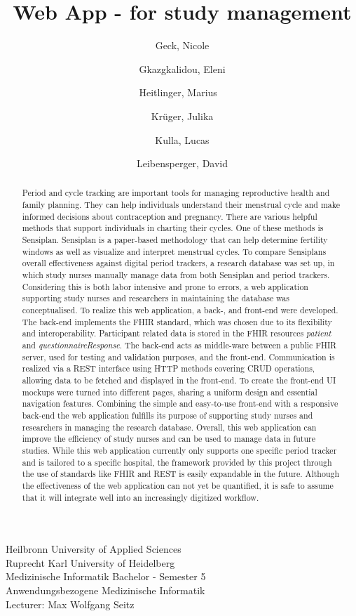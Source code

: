\documentclass[
a4paper,
11pt
]{article}
\title{Web App - for study management}
\author{
	Geck, Nicole
	\and
	Gkazgkalidou, Eleni
	\and
	Heitlinger, Marius
	\
	\and
	Krüger, Julika
	\and
	Kulla, Lucas
	\and
	Leibensperger, David
}
\begin{document}
	\maketitle
	\begin{center}
		\LARGE Heilbronn University of Applied Sciences
		\\
		\LARGE Ruprecht Karl University of Heidelberg
		\\
		\LARGE Medizinische Informatik Bachelor - Semester 5
		\\
		Anwendungsbezogene Medizinische Informatik
		\\
		Lecturer: Max Wolfgang Seitz
	\end{center}
	\newpage
	
	\begin{abstract}
		\noindent Period  and cycle tracking are important tools for managing reproductive health and family planning. They can help individuals understand their menstrual cycle and make informed decisions about contraception and pregnancy. There are various helpful methods that support individuals in charting their cycles. One of these methods is Sensiplan\textsuperscript{\textcopyright}. Sensiplan\textsuperscript{\textcopyright} is a paper-based methodology that can help determine fertility windows as well as visualize and interpret menstrual cycles. To compare Sensiplans\textsuperscript{\textcopyright} overall effectiveness against digital period trackers, a research database was set up, in which study nurses manually manage data from both Sensiplan\textsuperscript{\textcopyright} and period trackers. Considering this is both labor intensive and prone to errors, a web application supporting study nurses and researchers in maintaining the database was conceptualised. To realize this web application, a back-, and front-end were developed. The back-end implements the \ac{FHIR} standard, which was chosen due to its flexibility and interoperability. Participant related data is stored in the \ac{FHIR} resources \textit{patient} and \textit{questionnaireResponse}. The back-end acts as middle-ware between a public \ac{FHIR} server, used for testing and validation purposes, and the front-end. Communication is realized via a REST interface using \ac{HTTP} methods covering \ac{CRUD} operations, allowing data to be fetched and displayed in the front-end. To create the front-end \ac{UI} mockups were turned into different pages, sharing a uniform design and essential navigation features. Combining the simple and easy-to-use front-end with a responsive back-end the web application fulfills its purpose of supporting study nurses and researchers in managing the research database. Overall, this web application can improve the efficiency of study nurses and can be used to manage data in future studies. While this web application currently only supports one specific period tracker and is tailored to a specific hospital, the framework provided by this project through the use of standards like \ac{FHIR} and \ac{REST} is easily expandable in the future. Although the effectiveness of the web application can not yet be quantified, it is safe to assume that it will integrate well into an increasingly digitized workflow.
	\end{abstract}
\end{document}
